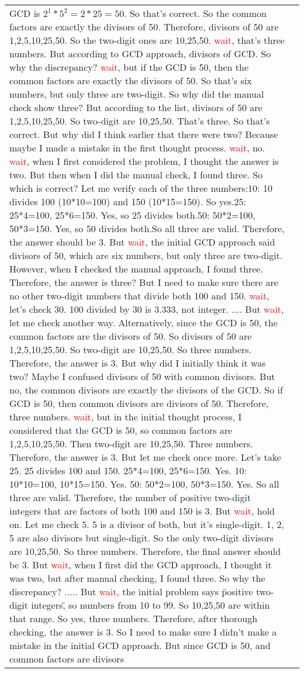 \begin{table*}[ht]
{\begin{tabular}{p{0.5in}|p{6.4in}}
GCD is $2^1 *5^2=2*25=50$. So that's correct. So the common factors are exactly the divisors of 50. Therefore, divisors of 50 are 1,2,5,10,25,50. So the two-digit ones are 10,25,50. \textcolor{red}{wait}, that's three numbers. But according to GCD approach, divisors of GCD. So why the discrepancy? \textcolor{red}{wait}, but if the GCD is 50, then the common factors are exactly the divisors of 50. So that's six numbers, but only three are two-digit. So why did the manual check show three? But according to the list, divisors of 50 are 1,2,5,10,25,50. So two-digit are 10,25,50. That's three. So that's correct. But why did I think earlier that there were two? Because maybe I made a mistake in the first thought process. \textcolor{red}{wait}, no. \textcolor{red}{wait}, when I first considered the problem, I thought the answer is two. But then when I did the manual check, I found three. So which is correct? Let me verify each of the three numbers:10: 10 divides 100 (10*10=100) and 150 (10*15=150). So yes.25: 25*4=100, 25*6=150. Yes, so 25 divides both.50: 50*2=100, 50*3=150. Yes, so 50 divides both.So all three are valid. Therefore, the answer should be 3. But \textcolor{red}{wait}, the initial GCD approach said divisors of 50, which are six numbers, but only three are two-digit. However, when I checked the manual approach, I found three. Therefore, the answer is three? But I need to make sure there are no other two-digit numbers that divide both 100 and 150. \textcolor{red}{wait}, let's check 30. 100 divided by 30 is 3.333, not integer. .... But \textcolor{red}{wait}, let me check another way. Alternatively, since the GCD is 50, the common factors are the divisors of 50. So divisors of 50 are 1,2,5,10,25,50. So two-digit are 10,25,50. So three numbers. Therefore, the answer is 3. But why did I initially think it was two? Maybe I confused divisors of 50 with common divisors. But no, the common divisors are exactly the divisors of the GCD. So if GCD is 50, then common divisors are divisors of 50. Therefore, three numbers. \textcolor{red}{wait}, but in the initial thought process, I considered that the GCD is 50, so common factors are 1,2,5,10,25,50. Then two-digit are 10,25,50. Three numbers. Therefore, the answer is 3. But let me check once more. Let's take 25. 25 divides 100 and 150. 25*4=100, 25*6=150. Yes. 10: 10*10=100, 10*15=150. Yes. 50: 50*2=100, 50*3=150. Yes. So all three are valid. Therefore, the number of positive two-digit integers that are factors of both 100 and 150 is 3. But \textcolor{red}{wait}, hold on. Let me check 5. 5 is a divisor of both, but it's single-digit. 1, 2, 5 are also divisors but single-digit. So the only two-digit divisors are 10,25,50. So three numbers. Therefore, the final answer should be 3. But \textcolor{red}{wait}, when I first did the GCD approach, I thought it was two, but after manual checking, I found three. So why the discrepancy? ..... But \textcolor{red}{wait}, the initial problem says \"positive two-digit integers\", so numbers from 10 to 99. So 10,25,50 are within that range. So yes, three numbers. Therefore, after thorough checking, the answer is 3. So I need to make sure I didn't make a mistake in the initial GCD approach. But since GCD is 50, and common factors are divisors 
\end{tabular}}
\end{table*}
